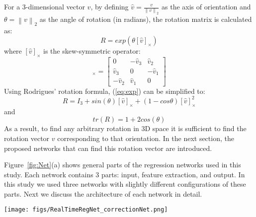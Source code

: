 \documentclass[journal,transmag]{IEEEtran}
\begin{document}
For a 3-dimensional vector $v$, by defining $\hat{v} = \frac{v}{\left \| v \right \|_2}$ as the axis of orientation and $\theta = {\left \| v \right \|_2}$ as the angle of rotation (in radians), the rotation matrix is calculated as:
\begin{equation}
    R = exp(\theta[\hat{v}]_\times)
    \label{eq:exp}
\end{equation}
where $[{\hat{v}}]_\times$ is the skew-symmetric operator:
\begin{equation}[{\hat{v}}]_\times = \begin{bmatrix}
0 & -\hat{v}_3 & \hat{v}_2 \\ 
\hat{v}_3 & 0 &-\hat{v}_1 \\ 
 -\hat{v}_2& \hat{v}_1 & 0
\end{bmatrix}
\label{skew}
\end{equation}
\noindent Using Rodrigues' rotation formula, (\ref{eq:exp}) can be simplified to:
\begin{equation}
    R = I_3 + sin(\theta)[\hat{v}]_\times + (1-cos\theta)[\hat{v}]_\times^2
    \label{rod}
\end{equation}
\noindent and
\begin{equation}
    tr(R) = 1 + 2cos(\theta)
    \label{trace}
\end{equation}
\noindent As a result, to find any arbitrary rotation in 3D space it is sufficient to find the rotation vector $v$ corresponding to that orientation. In the next section, the proposed networks that can find this rotation vector are introduced. 

Figure~\ref{fig:Net}(a) shows general parts of the regression networks used in this study. Each network contains 3 parts: input, feature extraction, and output. In this study we used three networks with slightly different configurations of these parts. Next we discuss the architecture of each network in detail.   
\begin{figure*}
    \centering
    \texttt{[image: figs/RealTimeRegNet\_correctionNet.png]}
    \caption{Schematic diagram of the proposed networks: (a) Different parts of a regression network; \textcolor{black}{(b) The proposed architecture of the slice 3D pose estimation network; (c) The feature extraction part of the volume 3D pose estimation network; (d) The proposed architecture of the volume 3D pose estimation network; and (e) The correction network used for the prediction of both rotation and translation parameters between moving and reference images.}}
    \label{fig:Net}
\end{figure*}
\end{document}

